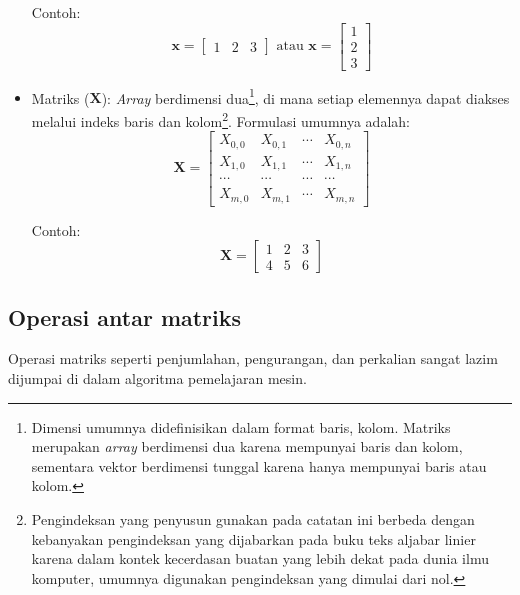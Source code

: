 \begin{itemize}
    Contoh:
    \begin{equation*}
        \mathbf{x} = \begin{bmatrix}1 & 2 & 3\end{bmatrix} \text{ atau } \mathbf{x} = \begin{bmatrix}1 \\ 2 \\ 3\end{bmatrix}
    \end{equation*}
    \item Matriks ($\mathbf{X}$): \textit{Array} berdimensi dua\footnote{Dimensi umumnya didefinisikan dalam format baris, kolom. Matriks merupakan \textit{array} berdimensi dua karena mempunyai baris dan kolom, sementara vektor berdimensi tunggal karena hanya mempunyai baris atau kolom.}, di mana setiap elemennya dapat diakses melalui indeks baris dan kolom\footnote{Pengindeksan yang penyusun gunakan pada catatan ini berbeda dengan kebanyakan pengindeksan yang dijabarkan pada buku teks aljabar linier karena dalam kontek kecerdasan buatan yang lebih dekat pada dunia ilmu komputer, umumnya digunakan pengindeksan yang dimulai dari nol.}. Formulasi umumnya adalah:
    \begin{equation}\label{eqn:eqn3}
        \textbf{X} = \begin{bmatrix}X_{0,0} & X_{0,1} & \cdots & X_{0,n}\\X_{1,0} & X_{1,1} & \cdots & X_{1,n}\\ \cdots & \cdots & \cdots & \cdots \\X_{m,0} & X_{m,1} & \cdots & X_{m,n} \end{bmatrix}
    \end{equation}
    
    Contoh:
    \begin{equation*}
        \textbf{X} = \begin{bmatrix}1 & 2 & 3\\4 & 5 & 6\end{bmatrix}
    \end{equation*}
\end{itemize}

\subsection{Operasi antar matriks}
Operasi matriks seperti penjumlahan, pengurangan, dan perkalian sangat lazim dijumpai di dalam algoritma pemelajaran mesin.
